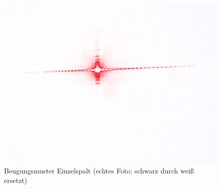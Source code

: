 \documentclass[12pt,a4paper]{article}
\begin{document}
\pagebreak
\setlength{\columnsep}{20pt}
\begin{multicols}{2}


%


%			



\end{multicols}
\begin{figure}[H]
	\centering
	\includegraphics[scale=0.35]{./figure/beugung.png}
	\caption{Beugungsmuster Einzelspalt (echtes Foto; schwarz durch weiß ersetzt)}
	\label{fig:beugungsmuster}
\end{figure}
\end{document}
